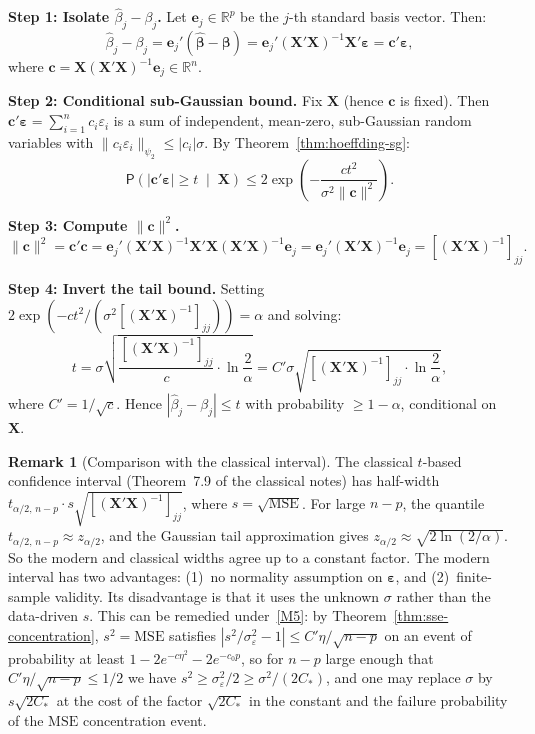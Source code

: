 \documentclass[12pt,a4paper]{article}
\makeatletter
\theoremstyle{definition}
\newtheorem{remark}[theorem]{Remark}
\renewenvironment{proof}[1][\proofname]{\par
  \pushQED{\qed}%
  \normalfont \topsep6\p@\@plus6\p@\relax
  \trivlist
  \item[\hskip\labelsep\bfseries #1\@addpunct{.}]\ignorespaces
}{%
  \popQED\endtrivlist\@endpefalse
}
\newcommand\prb{\mathsf{P}}
\newcommand{\MSE}{\mathrm{MSE}}
\newcommand{\bX}{\mathbf{X}}
\def\bb{\boldsymbol{\beta}}
\newcommand{\be}{\boldsymbol{\varepsilon}}
\def\bc{\mathbf{c}}
\newcommand{\Real}{\mathbb{R}}
\newcommand{\hbb}{\hat{\boldsymbol{\beta}}}
\makeatother
\begin{document}
\begin{proof}
\textbf{Step 1: Isolate $\hat\beta_j - \beta_j$.} Let $\mathbf{e}_j \in \Real^p$ be the $j$-th standard basis vector. Then:
\[
\hat\beta_j - \beta_j = \mathbf{e}_j'(\hbb - \bb) = \mathbf{e}_j'(\bX'\bX)^{-1}\bX'\be = \bc'\be,
\]
where $\bc = \bX(\bX'\bX)^{-1}\mathbf{e}_j \in \Real^n$.

\textbf{Step 2: Conditional sub-Gaussian bound.} Fix $\bX$ (hence $\bc$ is fixed). Then $\bc'\be = \sum_{i=1}^n c_i\varepsilon_i$ is a sum of independent, mean-zero, sub-Gaussian random variables with $\|c_i\varepsilon_i\|_{\psi_2} \leqslant |c_i|\sigma$. By Theorem~\ref{thm:hoeffding-sg}:
\[
\prb\!\left(|\bc'\be| \geqslant t \;\middle|\; \bX\right) \leqslant 2\exp\!\left(-\frac{ct^2}{\sigma^2\|\bc\|^2}\right).
\]

\textbf{Step 3: Compute $\|\bc\|^2$.}
\[
\|\bc\|^2 = \bc'\bc = \mathbf{e}_j'(\bX'\bX)^{-1}\bX'\bX(\bX'\bX)^{-1}\mathbf{e}_j = \mathbf{e}_j'(\bX'\bX)^{-1}\mathbf{e}_j = [(\bX'\bX)^{-1}]_{jj}.
\]

\textbf{Step 4: Invert the tail bound.} Setting $2\exp(-ct^2/(\sigma^2[(\bX'\bX)^{-1}]_{jj})) = \alpha$ and solving:
\[
t = \sigma\sqrt{\frac{[(\bX'\bX)^{-1}]_{jj}}{c}\cdot\ln\frac{2}{\alpha}} = C'\sigma\sqrt{[(\bX'\bX)^{-1}]_{jj}\cdot\ln\frac{2}{\alpha}},
\]
where $C' = 1/\sqrt{c}$. Hence $|\hat\beta_j - \beta_j| \leqslant t$ with probability $\geqslant 1 - \alpha$, conditional on $\bX$.
\end{proof}

\begin{remark}[Comparison with the classical interval]
The classical $t$-based confidence interval (Theorem~7.9 of the classical notes) has half-width $t_{\alpha/2,\,n-p}\cdot s\sqrt{[(\bX'\bX)^{-1}]_{jj}}$, where $s = \sqrt{\MSE}$. For large $n - p$, the quantile $t_{\alpha/2,\,n-p} \approx z_{\alpha/2}$, and the Gaussian tail approximation gives $z_{\alpha/2} \approx \sqrt{2\ln(2/\alpha)}$. So the modern and classical widths agree up to a constant factor. The modern interval has two advantages: (1)~no normality assumption on $\be$, and (2)~finite-sample validity. Its disadvantage is that it uses the unknown $\sigma$ rather than the data-driven $s$. This can be remedied under~\ref{M5}: by Theorem~\ref{thm:sse-concentration}, $s^2 = \MSE$ satisfies $|s^2/\sigma_\varepsilon^2 - 1| \leqslant C'\eta/\sqrt{n-p}$ on an event of probability at least $1 - 2e^{-c\eta^2} - 2e^{-c_0p}$, so for $n - p$ large enough that $C'\eta/\sqrt{n-p} \leqslant 1/2$ we have $s^2 \geqslant \sigma_\varepsilon^2/2 \geqslant \sigma^2/(2C_*)$, and one may replace $\sigma$ by $s\sqrt{2C_*}$ at the cost of the factor $\sqrt{2C_*}$ in the constant and the failure probability of the $\MSE$ concentration event.
\end{remark}
\end{document}
